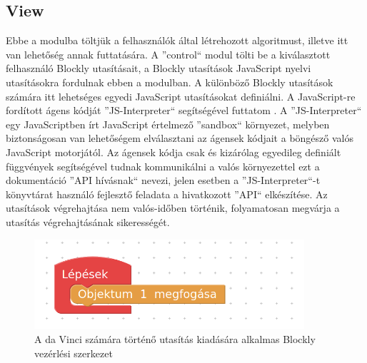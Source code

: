 \documentclass[12pt,a4paper,oneside]{report} %
\begin{document}
\subsection{View}
Ebbe a modulba töltjük  a felhasználók által létrehozott algoritmust, illetve itt van lehetőség annak futtatására. A ''control`` modul tölti be a kiválasztott felhasználó Blockly utasításait, a Blockly utasítások JavaScript nyelvi utasításokra fordulnak ebben a modulban. A különböző Blockly utasítások számára itt lehetséges egyedi JavaScript utasításokat definiálni. A JavaScript-re fordított ágens kódját ''JS-Interpreter`` segítségével futtatom \cite{BibEntry2020Feb}. A ''JS-Interpreter`` egy JavaScriptben írt JavaScript értelmező ''sandbox`` környezet, melyben biztonságosan van lehetőségem elválasztani az ágensek kódjait a böngésző valós JavaScript motorjától. Az ágensek kódja csak és kizárólag egyedileg definiált függvények segítségével tudnak kommunikálni a valós környezettel ezt a dokumentáció ''API hívásnak`` nevezi, jelen esetben a ''JS-Interpreter``-t könyvtárat használó fejlesztő feladata a hivatkozott ''API`` elkészítése. Az utasítások végrehajtása nem valós-időben történik, folyamatosan megvárja a utasítás végrehajtásának sikerességét. 

\begin{figure}[H]
\centering
\label{fig:davinciblock}
\includegraphics[width=10cm]{davinciblock}
\caption{A da Vinci számára történő utasítás kiadására alkalmas Blockly vezérlési szerkezet }
\end{figure}
\end{document}
